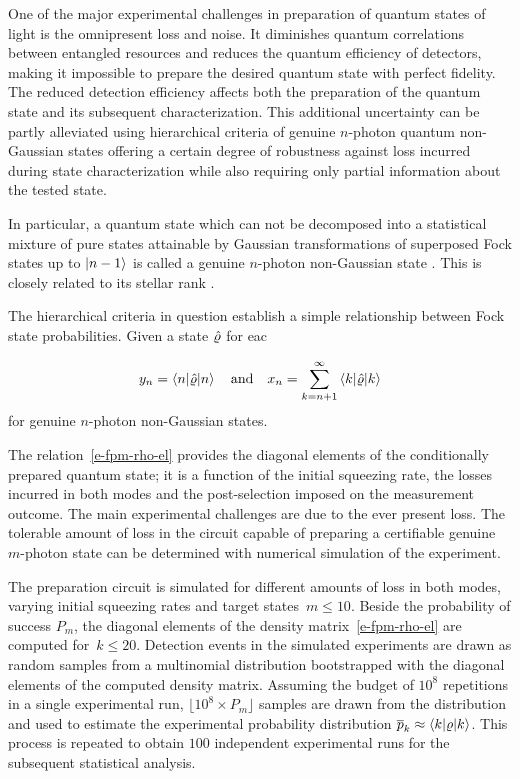 \documentclass{article}
\begin{document}
One of the major experimental challenges in preparation of quantum states of light is the omnipresent loss and noise. It diminishes quantum correlations between entangled resources and reduces the quantum efficiency of detectors, making it impossible to prepare the desired quantum state with perfect fidelity. The reduced detection efficiency affects both the preparation of the quantum state and its subsequent characterization. This additional uncertainty can be partly alleviated using hierarchical criteria of genuine $n$-photon quantum non-Gaussian states \cite{lachman2019} offering a certain degree of robustness against loss incurred during state characterization while also requiring only partial information about the tested state.

In particular, a quantum state which can not be decomposed into a statistical mixture of pure states attainable by Gaussian transformations of superposed Fock states up to $\ket{n - 1}$ is called a genuine $n$-photon non-Gaussian state \cite{lachman2019}. This is closely related to its stellar rank \cite{chabaud2020,fiurasek2022}. 

The hierarchical criteria \cite{lachman2019} in question establish a simple relationship between Fock state probabilities. Given a state $\hat{\varrho}$ for eac

\begin{equation}
  y_{n} = \braket{n | \hat{\varrho} | n } \quad\text{and}\quad
  x_{n} = \sum_{k = n + 1}^{\infty} \braket{k | \hat{\varrho} | k}
\end{equation}
for genuine $n$-photon non-Gaussian states.

%
%


The relation~\eqref{e-fpm-rho-el} provides the diagonal elements of the conditionally prepared quantum state; it is a function of the initial squeezing rate, the losses incurred in both modes and the post-selection imposed on the measurement outcome. The main experimental challenges are due to the ever present loss. The tolerable amount of loss in the circuit capable of preparing a certifiable genuine $m$-photon state can be determined with numerical simulation of the experiment. 

The preparation circuit is simulated for different amounts of loss in both modes, varying initial squeezing rates and target states~${m \leq 10}$. Beside the probability of success $P_{m}$, the diagonal elements of the density matrix~\eqref{e-fpm-rho-el} are computed for~${k \leq 20}$. Detection events in the simulated experiments are drawn as random samples from a multinomial distribution bootstrapped with the diagonal elements of the computed density matrix. Assuming the budget of $10^{8}$ repetitions in a single experimental run, ${\lfloor 10^{8} \times P_{m} \rfloor}$ samples are drawn from the distribution and used to estimate the experimental probability distribution ${\overline{p}_{k} \approx \braket{k|\varrho|k}}$. This process is repeated to obtain $100$ independent experimental runs for the subsequent statistical analysis.
\end{document}
